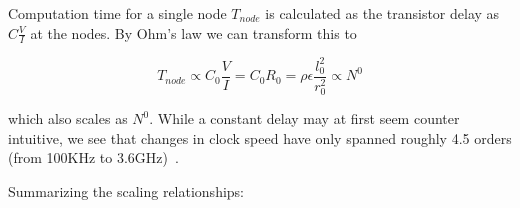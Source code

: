 \documentclass[12pt]{article}
\begin{document}
%
%
%
%
%


Computation time for a single node $T_{node}$ is calculated as the transistor
delay as $C\frac{V}{I}$ \cite{bakoglu90} at the nodes. By Ohm's law we can
transform this to 

\begin{equation}
  T_{node} \propto C_0 \frac{V}{I} = C_0 R_0 = \rho \epsilon
  \frac{l_0^2}{r_0^2} \propto N^0
\end{equation}

\noindent which also scales as $N^{0}$. While a constant delay may at first
seem counter intuitive, we see that changes in clock speed have only spanned
roughly 4.5 orders (from 100KHz to 3.6GHz)~\cite{intelData}. 

Summarizing the scaling relationships: 
\end{document}
